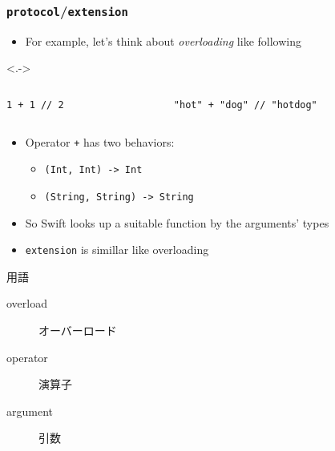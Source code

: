 \begin{frame}[fragile]
  \frametitle{\texttt{protocol}/\texttt{extension}}
  

  \begin{itemize}
    \item<+-> For example, let's think about \emph{overloading} like following
  \end{itemize}

  \begin{uncoverenv}<.->
    \begin{columns}
      \begin{column}{0.5\textwidth}
\begin{lstlisting}[style=swift]
1 + 1 // 2
\end{lstlisting}
    \end{column}
    \begin{column}{0.5\textwidth}
\begin{lstlisting}[style=swift]
"hot" + "dog" // "hotdog"
\end{lstlisting}
      \end{column}
    \end{columns}
  \end{uncoverenv}

  \begin{itemize}
    \item<+-> Operator \lstinline|+| has two behaviors:
    \begin{itemize}
      \item \lstinline|(Int, Int) -> Int|
      \item \lstinline|(String, String) -> String|
    \end{itemize}

    \item<+-> So Swift looks up a suitable function by
    the arguments' types

    \item<+-> \lstinline|extension| is simillar like overloading
  \end{itemize}

  \begin{notes}
    \item 用語
    \begin{description}
      \item[overload] オーバーロード
      \item[operator] 演算子
      \item[argument] 引数
    \end{description}


\end{notes}
\end{frame}
